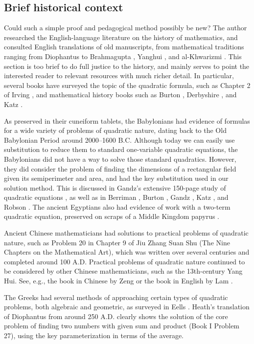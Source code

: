 \subsection{Brief historical context}
\label{sec:history}

Could such a simple proof and pedagogical method possibly be new? The author
researched the English-language literature on the history of mathematics, and
consulted English translations of old manuscripts, from mathematical traditions
ranging from Diophantus \cite{diophantus} to Brahmagupta \cite{brahmagupta},
Yanghui \cite{yanghui}, and al-Khwarizmi \cite{al-khwarizmi}. This section is
too brief to do full justice to the history, and mainly serves to point the
interested reader to relevant resources with much richer detail. In particular,
several books have surveyed the topic of the quadratic formula, such as Chapter
2 of Irving \cite{irving}, and mathematical history books such as Burton
\cite{burton}, Derbyshire \cite{derbyshire}, and Katz \cite{katz}.

As preserved in their cuneiform tablets, the Babylonians had evidence of
formulas for a wide variety of problems of quadratic nature, dating back to the
Old Babylonian Period around 2000--1600 B.C. Although today we can easily use
substitution to reduce them to standard one-variable quadratic equations, the
Babylonians did not have a way to solve those standard quadratics.  However,
they did consider the problem of finding the dimensions of a rectangular field
given its semiperimeter and area, and had the key substitution used in our
solution method. This is discussed in Gandz's extensive 150-page study of
quadratic equations \cite{gandz-1937}, as well as in Berriman \cite{berriman},
Burton \cite{burton}, Gandz \cite{gandz-1940}, Katz \cite{katz}, and Robson
\cite{robson}.  The ancient Egyptians also had evidence of work with a two-term
quadratic equation, preserved on scraps of a Middle Kingdom papyrus
\cite{edwards-mideast}.

Ancient Chinese mathematicians had solutions to practical problems of
quadratic nature, such as Problem 20 in Chapter 9 of Jiu Zhang Suan Shu
(The Nine Chapters on the Mathematical Art), which was written over several
centuries and completed around 100 A.D. Practical problems of quadratic
nature continued to be considered by other Chinese mathematicians, such as
the 13th-century Yang Hui. See, e.g., the book in Chinese by Zeng
\cite{zeng} or the book in English by Lam \cite{lam}.

The Greeks had several methods of approaching certain types of quadratic
problems, both algebraic and geometric, as surveyed in Eells \cite{eells}.
Heath's translation \cite{heath} of Diophantus \cite{diophantus} from
around 250 A.D. clearly shows the solution of the core problem of finding
two numbers with given sum and product (Book I Problem 27), using the key
parameterization in terms of the average.

